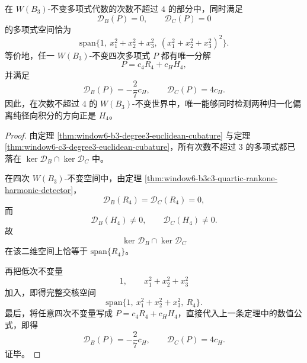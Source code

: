\begin{corollary}[双归一化四次判别器的唯一性]\label{cor:window6-b3c3-unique-quartic-detector}
在 \(W(B_3)\)-不变多项式代数的次数不超过 \(4\) 的部分中，同时满足
\[
\mathcal D_B(P)=0,
\qquad
\mathcal D_C(P)=0
\]
的多项式空间恰为
\[
\mathrm{span}\bigl\{1,\ x_1^2+x_2^2+x_3^2,\ (x_1^2+x_2^2+x_3^2)^2\bigr\}.
\]
等价地，任一 \(W(B_3)\)-不变四次多项式 \(P\) 都有唯一分解
\[
P=c_4R_4+c_HH_4,
\]
并满足
\[
\mathcal D_B(P)=-\frac{2}{7}c_H,
\qquad
\mathcal D_C(P)=4c_H.
\]
因此，在次数不超过 \(4\) 的 \(W(B_3)\)-不变世界中，唯一能够同时检测两种归一化偏离纯径向积分的方向正是 \(H_4\)。
\end{corollary}
\begin{proof}
由定理 \ref{thm:window6-b3-degree3-euclidean-cubature} 与定理 \ref{thm:window6-c3-degree3-euclidean-cubature}，所有次数不超过 \(3\) 的多项式都已落在 \(\ker \mathcal D_B\cap \ker \mathcal D_C\) 中。

在四次 \(W(B_3)\)-不变空间中，由定理 \ref{thm:window6-b3c3-quartic-rankone-harmonic-detector}，
\[
\mathcal D_B(R_4)=\mathcal D_C(R_4)=0,
\]
而
\[
\mathcal D_B(H_4)\neq 0,
\qquad
\mathcal D_C(H_4)\neq 0.
\]
故
\[
\ker \mathcal D_B\cap \ker \mathcal D_C
\]
在该二维空间上恰等于 \(\mathrm{span}\{R_4\}\)。

再把低次不变量
\[
1,\qquad x_1^2+x_2^2+x_3^2
\]
加入，即得完整交核空间
\[
\mathrm{span}\bigl\{1,\ x_1^2+x_2^2+x_3^2,\ R_4\bigr\}.
\]
最后，将任意四次不变量写成 \(P=c_4R_4+c_HH_4\)，直接代入上一条定理中的数值公式，即得
\[
\mathcal D_B(P)=-\frac{2}{7}c_H,
\qquad
\mathcal D_C(P)=4c_H.
\]
证毕。
\end{proof}
